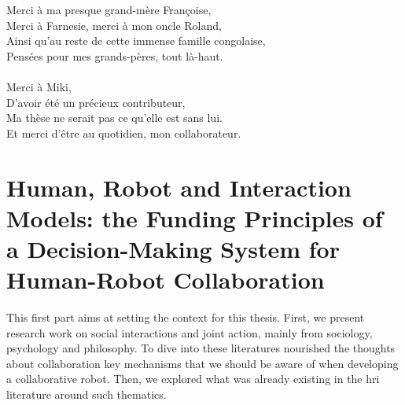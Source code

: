 \documentclass[english,a4paper,11pt,twoside]{StyleThese}
\begin{document}
Merci à ma presque grand-mère Françoise,\\
Merci à Farnesie, merci à mon oncle Roland,\\
Ainsi qu'au reste de cette immense famille congolaise,\\
Pensées pour mes grands-pères, tout là-haut.\\
\\
Merci à Miki,\\
D'avoir été un précieux contributeur,\\
Ma thèse ne serait pas ce qu'elle est sans lui.\\
Et merci d'être au quotidien, mon collaborateur.






\tableofcontents

\printnoidxglossary[type=\acronymtype]
%



\mainmatter
{}

\fancyhead[RE]{\bfseries\nouppercase{\leftmark}}      %
\fancyhead[LO]{\bfseries\nouppercase{\rightmark}}     %

\part{Human, Robot and Interaction Models: the Funding Principles of a Decision-Making System for Human-Robot Collaboration}\label{part:part1}
\begin{partintro}
	This first part aims at setting the context for this thesis. First, we present research work on social interactions and joint action, mainly from sociology, psychology and philosophy. To dive into these literatures nourished the thoughts about collaboration key mechanisms that we should be aware of when developing a collaborative robot. Then, we explored what was already existing in the \acrlong{hri} literature around such thematics.
\end{partintro}


\end{document}
